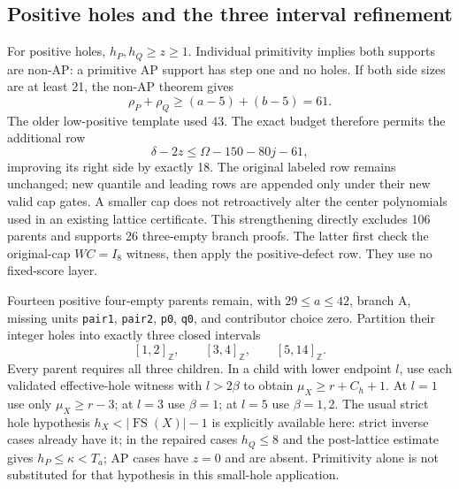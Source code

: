 \documentclass[11pt,a4paper]{article}
\theoremstyle{remark}
\newcommand{\FS}{\operatorname{FS}}
\newcommand{\Z}{\mathbb Z}
\begin{document}
\subsection{Positive holes and the three interval refinement}
For positive holes, $h_P,h_Q\ge z\ge1$. Individual primitivity implies
both supports are non-AP: a primitive AP support has step one and no
holes. If both side sizes are at least 21, the non-AP theorem
gives
\[
 \rho_P+\rho_Q\ge(a-5)+(b-5)=61.
\]
The older low-positive template used 43. The exact budget therefore
permits the additional row
\[
 \delta-2z\le\Omega-150-80j-61,
\]
improving its right side by exactly 18. The original labeled row remains
unchanged; new quantile and leading rows are appended only under their
new valid cap gates. A smaller cap does not retroactively alter the
center polynomials used in an existing lattice certificate.
This strengthening directly excludes 106 parents and supports 26
three-empty branch proofs. The latter first check the original-cap
$WC=I_8$ witness, then apply the positive-defect row. They use no
fixed-score layer.

Fourteen positive four-empty parents remain, with $29\le a\le42$,
branch A, missing units \texttt{pair1}, \texttt{pair2}, \texttt{p0},
\texttt{q0}, and contributor choice zero. Partition their integer holes
into exactly three closed intervals
\[
 [1,2]_{\Z},\qquad[3,4]_{\Z},\qquad[5,14]_{\Z}.
\]
Every parent requires all three children.
In a child with lower endpoint $l$, use each validated effective-hole
witness with $l>2\beta$ to obtain $\mu_X\ge r+C_h+1$.
At $l=1$ use only $\mu_X\ge r-3$; at $l=3$ use $\beta=1$;
at $l=5$ use $\beta=1,2$.
The usual strict hole hypothesis $h_X<|\FS(X)|-1$ is explicitly
available here: strict inverse cases already have it; in the repaired
cases $h_Q\le8$ and the post-lattice estimate gives
$h_P\le\kappa<T_a$; AP cases have $z=0$ and are absent.
Primitivity alone is not substituted for that hypothesis in this
small-hole application.
\end{document}
